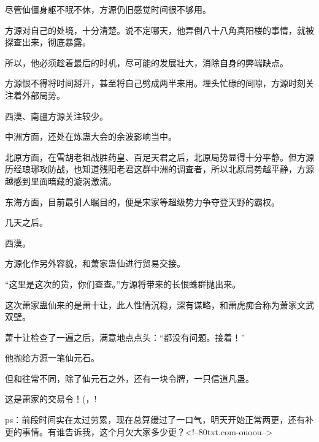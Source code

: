 \begin{this_body}
尽管仙僵身躯不眠不休，方源仍旧感觉时间很不够用。

方源对自己的处境，十分清楚。说不定哪天，他弄倒八十八角真阳楼的事情，就被探查出来，彻底暴露。

所以，他必须趁着最后的时机，尽可能的发展壮大，消除自身的弊端缺点。

方源恨不得将时间掰开，甚至将自己劈成两半来用。埋头忙碌的间隙，方源时刻关注着外部局势。

西漠、南疆方源关注较少。

中洲方面，还处在炼蛊大会的余波影响当中。

北原方面，在雪胡老祖战胜药皇、百足天君之后，北原局势显得十分平静。但方源历经琅琊攻防战，也知道残阳老君这群中洲的调查者，所以北原局势越平静，方源越感到里面暗藏的漩涡激流。

东海方面，目前最引人瞩目的，便是宋家等超级势力争夺登天野的霸权。

几天之后。

西漠。

方源化作另外容貌，和萧家蛊仙进行贸易交接。

“这里是这次的货，你们查查。”方源将带来的长恨蛛群抛出来。

这次萧家蛊仙来的是萧十让，此人性情沉稳，深有谋略，和萧虎痴合称为萧家文武双壁。

萧十让检查了一遍之后，满意地点点头：“都没有问题。接着！”

他抛给方源一笔仙元石。

但和往常不同，除了仙元石之外，还有一块令牌，一只信道凡蛊。

这是萧家的交易令！(，!

ps：前段时间实在太过劳累，现在总算缓过了一口气，明天开始正常两更，还有补更的事情。有谁告诉我，这个月欠大家多少更？<!--80txt.com-ouoou-->

\end{this_body}

